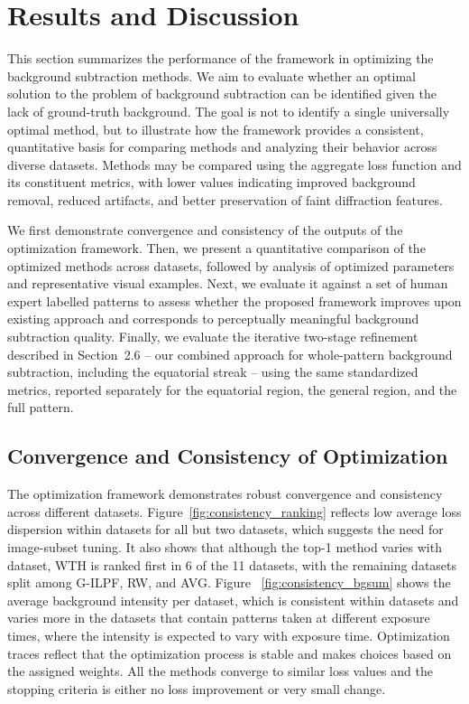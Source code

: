\documentclass[iucr]{iucrjournals}
\begin{document}
\section{Results and Discussion}

This section summarizes the performance of the framework in optimizing the background subtraction methods. We aim to evaluate whether an optimal solution to the problem of background subtraction can be identified given the lack of ground-truth background. The goal is not to identify a single universally optimal method, but to illustrate how the framework provides a consistent, quantitative basis for comparing methods and analyzing their behavior across diverse datasets. Methods may be compared using the aggregate loss function and its constituent metrics, with lower values indicating improved background removal, reduced artifacts, and better preservation of faint diffraction features.

We first demonstrate convergence and consistency of the outputs of the optimization framework. Then, we present a quantitative comparison of the optimized methods across datasets, followed by analysis of optimized parameters and representative visual examples. Next, we evaluate it against a set of human expert labelled patterns to assess whether the proposed framework improves upon existing approach and corresponds to perceptually meaningful background subtraction quality. Finally, we evaluate the iterative two-stage refinement described in Section~2.6 -- our combined approach for whole-pattern background subtraction, including the equatorial streak -- using the same standardized metrics, reported separately for the equatorial region, the general region, and the full pattern.

\subsection{Convergence and Consistency of Optimization}

The optimization framework demonstrates robust convergence and consistency across different datasets. Figure~\ref{fig:consistency_ranking} reflects low average loss dispersion within datasets for all but two datasets, which suggests the need for image-subset tuning. It also shows that although the top-1 method varies with dataset, WTH is ranked first in 6 of the 11 datasets, with the remaining datasets split among G-ILPF, RW, and AVG. Figure ~\ref{fig:consistency_bgsum} shows the average background intensity per dataset, which is consistent within datasets and varies more in the datasets that contain patterns taken at different exposure times, where the intensity is expected to vary with exposure time.
Optimization traces reflect that the optimization process is stable and makes choices based on the assigned weights. All the methods converge to similar loss values and the stopping criteria is either no loss improvement or very small change.
\end{document}
